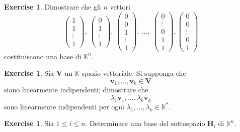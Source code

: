\documentclass{article}
\theoremstyle{plain}
\theoremstyle{definition}
\newtheorem{xca}[exmp]{Exercise}
\theoremstyle{remark}
\begin{document}
\begin{bxthm}
\begin{xca}
    Dimostrare che gli $n$ vettori
    \[
    \begin{pmatrix} 1\\1\\\vdots\\1 \end{pmatrix},\ 
    \begin{pmatrix} 0\\1\\\vdots\\1 \end{pmatrix},\ 
    \begin{pmatrix} 0\\0\\1\\\vdots\\1 \end{pmatrix},\ 
    \ldots,\ 
    \begin{pmatrix} 0\\\vdots\\0\\1\\1 \end{pmatrix},
    \begin{pmatrix} 0\\0\\\vdots\\0\\1 \end{pmatrix}
    \]
    costituiscono una base di $\mathbb{K}^n$.
\end{xca}
\end{bxthm}

\vspace{10pt}

\begin{bxthm}
\begin{xca}
    Sia $\mathbf{V}$ un $\mathbb{K}$-spazio vettoriale. Si supponga che 
    \[
    \mathbf{v}_1,\ldots,\mathbf{v}_k\in \mathbf{V}
    \]
    siano linearmente indipendenti; dimostrare che 
    \[
    \lambda_1\mathbf{v}_1,\ldots,\lambda_k\mathbf{v}_k
    \]
    sono linearmente indipendenti per ogni $\lambda_1,\ldots,\lambda_k\in \mathbb{K}^*$.
\end{xca}
\end{bxthm}

\begin{bxthm}
\begin{xca}
    Sia $1\leq i\leq n$. Determinare una base del sottospazio $\mathbf{H}_i$ di $\mathbb{K}^n$.
\end{xca}
\end{bxthm}
\end{document}
